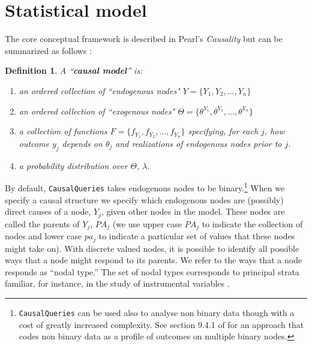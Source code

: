 \documentclass[
  11pt,
  article]{jss}
\newtheorem{definition}{Definition}
\begin{document}
\hypertarget{sec-theory}{%
\section{Statistical model}\label{sec-theory}}

The core conceptual framework is described in Pearl's \emph{Causality}
\citep{pearl_causality_2009} but can be summarized as follows
\citep[using the notation proposed in][]{humphreys_integrated_2023}:

\begin{definition}
  
  A ``\textbf{causal model}'' is:
  \begin{enumerate}
    \item an ordered collection of ``endogenous nodes" $Y = \{Y_1, Y_2, \dots, Y_n\}$
    \item an ordered collection of ``exogenous nodes" $\Theta = \{\theta^{Y_1}, \theta^{Y_1}, \dots, \theta^{Y_n}\}$
    \item a collection of functions $F = \{f_{Y_1}, f_{Y_2}, \dots, f_{Y_n}\}$ specifying, for each $j$, how outcome $y_j$ depends on $\theta_j$ and realizations of endogenous nodes prior to $j$.
    \item a probability distribution over $\Theta$, $\lambda$.
  \end{enumerate}
  
\end{definition}

By default, \texttt{CausalQueries} takes endogenous nodes to be
binary.\footnote{\texttt{CausalQueries} can be used also to analyse non
  binary data though with a cost of greatly increased complexity. See
  section 9.4.1 of \citet{humphreys_integrated_2023} for an approach
  that codes non binary data as a profile of outcomes on multiple binary
  nodes.} When we specify a causal structure we specify which endogenous
nodes are (possibly) direct causes of a node, \(Y_j\), given other nodes
in the model. These nodes are called the parents of \(Y_j\), \(PA_j\)
(we use upper case \(PA_j\) to indicate the collection of nodes and
lower case \(pa_j\) to indicate a particular set of values that these
nodes might take on). With discrete valued nodes, it is possible to
identify all possible ways that a node might respond to its parents. We
refer to the ways that a node responds as ``nodal type.'' The set of
nodal types corresponds to principal strata familiar, for instance, in
the study of instrumental variables \citep{frangakis_principal_2002}.
\end{document}
